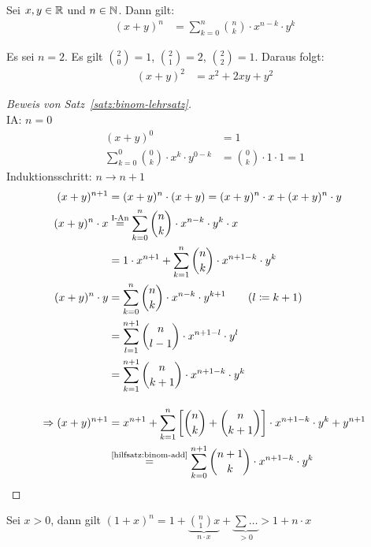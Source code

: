 \begin{satz}
    \label{satz:binom-lehrsatz}
    Sei $x,y\in\mathbb{R}$ und $n\in\mathbb{N}$. Dann gilt:
    \begin{align*}
    (x+y)
        ^{n} &= \sum_{k=0}^{n} \binom{n}{k}\cdot x^{n-k}\cdot y^k
    \end{align*}
\end{satz}
\begin{beispiel}
    Es sei $n=2$. Es gilt $\binom{2}{0}=1$, $\binom{2}{1}=2$, $\binom{2}{2}=1$. Daraus folgt:
    \begin{align*}
    (x+y)
        ^{2} &= x^2+2xy+y^2
    \end{align*}
\end{beispiel}
\begin{proof}[Beweis von Satz~\ref{satz:binom-lehrsatz}]
    ~\\IA: $n=0$
    \begin{align*}
    (x+y)
        ^0&=1\\
        \sum_{k=0}^0\binom{0}{k}\cdot x^{k}\cdot y^{0-k} &= \binom{0}{k}\cdot 1\cdot 1 = 1
    \end{align*}
    Induktionsschritt: $n\rightarrow n+1$
    \begin{align*}
    (x+y)
        ^{n+1} &= (x+y)^n\cdot (x+y) = (x+y)^n \cdot x + (x+y)^n\cdot y\\
        (x+y)^n\cdot x &\annot{=}{I-An} \sum_{k=0}^{n}\binom{n}{k}\cdot x^{n-k}\cdot y^k\cdot x\\
        &=1\cdot x^{n+1} + \sum_{k=1}^{n} \binom{n}{k}\cdot x^{n+1-k}\cdot y^{k}\\
        (x+y)^n\cdot y &= \sum_{k=0}^{n}\binom{n}{k}\cdot x^{n-k}\cdot y^{k+1}\tag{$l\definedas k+1$}\\
        &= \sum_{l=1}^{n+1} \binom{n}{l-1}\cdot x^{n+1-l}\cdot y^{l}\\
        &= \sum_{k=1}^{n+1} \binom{n}{k+1}\cdot x^{n+1-k} \cdot y^{k}\\[10pt]
        \impl (x+y)^{n+1} &= x^{n+1} + \sum_{k=1}^{n} \interv{\binom{n}{k}+\binom{n}{k+1}} \cdot x^{n+1-k}\cdot y^k + y^{n+1}\\
        &\annot{=}{\ref{hilfsatz:binom-add}} \sum_{k=0}^{n+1} \binom{n+1}{k}\cdot x^{n+1-k}\cdot y^{k}\qedhere
    \end{align*}
\end{proof}

\begin{bemerkung}
    Sei $x>0$, dann gilt $(1+x)^n = 1+\underbrace{\binom{n}{1}x}_{n\cdot x} + \underbrace{\sum \dots}_{>0} > 1 + n\cdot x$
\end{bemerkung}

